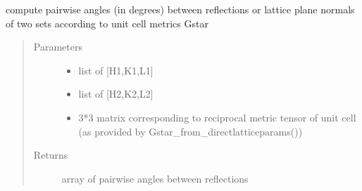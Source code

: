 \documentclass[letterpaper,10pt,english]{sphinxmanual}
\begin{document}
\begin{fulllineitems}
\label{\detokenize{Simulation_Module:LaueTools.CrystalParameters.AngleBetweenNormals}}
compute pairwise angles (in degrees) between reflections or lattice plane normals
of two sets according to unit cell metrics Gstar
\begin{quote}\begin{description}
\item[{Parameters}] \leavevmode\begin{itemize}
\item {} 
 \textendash{} list of {[}H1,K1,L1{]}

\item {} 
 \textendash{} list of {[}H2,K2,L2{]}

\item {} 
 \textendash{} 3*3 matrix corresponding to reciprocal metric tensor of unit cell (as provided by Gstar\_from\_directlatticeparams())

\end{itemize}

\item[{Returns}] \leavevmode
array of pairwise angles between reflections

\end{description}\end{quote}

\end{fulllineitems}

\end{document}
